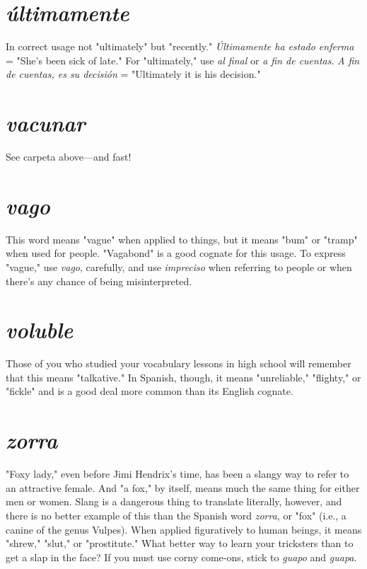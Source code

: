 \documentclass[14pt,a4paper,oneside]{memoir}
\begin{document}
\section{\emph{últimamente}}

In correct usage not "ultimately" but "recently." \emph{Últimamente ha estado enferma} = "She's been sick of late."
For "ultimately," use \emph{al final} or \emph{a fin de cuentas}. \emph{A fin de cuentas, es
	su decisión} = "Ultimately it is his decision."

\section{\emph{vacunar}}

See carpeta above---and fast!

\section{\emph{vago}}

This word means "vague" when applied to things, but
it means "bum" or "tramp" when used for people. "Vagabond" is a
good cognate for this usage. To express "vague," use \emph{vago}, carefully,
and use \emph{impreciso} when referring to people or when there's any chance
of being misinterpreted.

\section{\emph{voluble}}

Those of you who studied your vocabulary lessons
in high school will remember that this means "talkative." In Spanish,
though, it means "unreliable," "flighty," or "fickle" and is a good deal
more common than its English cognate.

\section{\emph{zorra}}

"Foxy lady," even before Jimi Hendrix's time, has
been a slangy way to refer to an attractive female. And "a fox," by itself, means much the same thing for either men or women. Slang is a
dangerous thing to translate literally, however, and there is no better
example of this than the Spanish word \emph{zorra}, or "fox" (i.e., a canine
of the genus Vulpes). When applied figuratively to human beings, it
means "shrew," "slut," or "prostitute." What better way to learn your
tricksters than to get a slap in the face? If you must use corny come-ons, stick to \emph{guapo} and \emph{guapa}.
\end{document}
